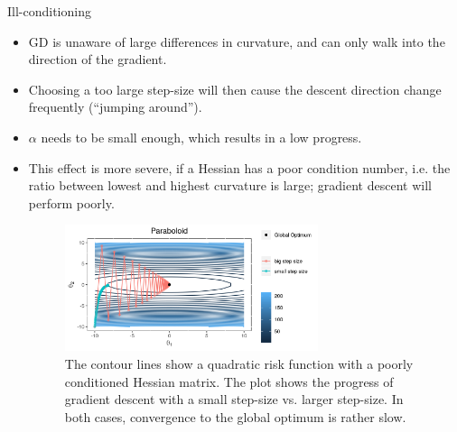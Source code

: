 \begin{vbframe} {Ill-conditioning}


\begin{itemize}

  \item GD is unaware of large differences in curvature, and can only walk into the direction of the gradient.  
  \item Choosing a too large step-size will then cause the descent direction change frequently (\enquote{jumping around}).
  \item $\alpha$ needs to be small enough, which results in a low progress.
  
  \framebreak
  
  \item This effect is more severe, if a Hessian has a poor condition number, i.e. the ratio between lowest and highest curvature is large; gradient descent will perform poorly. 
  \begin{figure}
  \captionsetup{font=footnotesize,labelfont=footnotesize, labelfont = bf}
  \begin{center}
  \includegraphics[width=0.7\textwidth]{figure/big_small_stepsize.png}
  \end{center}
  \caption{The contour lines show a quadratic risk function with a poorly conditioned Hessian matrix. The plot shows the progress of gradient descent with a small step-size vs. larger step-size. In both cases, convergence to the global optimum is rather slow. }
  \end{figure}


\end{itemize}
\end{vbframe}
